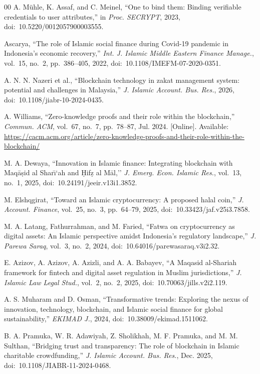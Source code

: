 \documentclass[conference]{IEEEtran}
\begin{document}
\begin{thebibliography}{00}
A. M\"{u}hle, K. Assaf, and C. Meinel, ``One to bind them: Binding verifiable credentials to user attributes,'' in \textit{Proc. SECRYPT}, 2023, doi:~10.5220/0012057900003555.

Ascarya, ``The role of Islamic social finance during Covid-19 pandemic in Indonesia's economic recovery,'' \textit{Int. J. Islamic Middle Eastern Finance Manage.}, vol.~15, no.~2, pp.~386--405, 2022, doi:~10.1108/IMEFM-07-2020-0351.

A. N. N. Nazeri et al., ``Blockchain technology in zakat management system: potential and challenges in Malaysia,'' \textit{J. Islamic Account. Bus. Res.}, 2026, doi:~10.1108/jiabr-10-2024-0435.

A. Williams, ``Zero-knowledge proofs and their role within the blockchain,'' \textit{Commun. ACM}, vol.~67, no.~7, pp.~78--87, Jul. 2024. [Online]. Available: \url{https://cacm.acm.org/article/zero-knowledge-proofs-and-their-role-within-the-blockchain/}

M. A. Dewaya, ``Innovation in Islamic finance: Integrating blockchain with Maq\={a}\d{s}id al Shar\={\i}`ah and \d{H}if\d{z} al M\={a}l,'' \textit{J. Emerg. Econ. Islamic Res.}, vol.~13, no.~1, 2025, doi:~10.24191/jeeir.v13i1.3852.

M. Elshqgirat, ``Toward an Islamic cryptocurrency: A proposed halal coin,'' \textit{J. Account. Finance}, vol.~25, no.~3, pp.~64--79, 2025, doi:~10.33423/jaf.v25i3.7858.

M. A. Latang, Fathurrahman, and M. Faried, ``Fatwa on cryptocurrency as digital assets: An Islamic perspective amidst Indonesia's regulatory landscape,'' \textit{J. Parewa Saraq}, vol.~3, no.~2, 2024, doi:~10.64016/parewasaraq.v3i2.32.

E. Azizov, A. Azizov, A. Azizli, and A. A. Babayev, ``A Maqasid al-Shariah framework for fintech and digital asset regulation in Muslim jurisdictions,'' \textit{J. Islamic Law Legal Stud.}, vol.~2, no.~2, 2025, doi:~10.70063/jills.v2i2.119.

A. S. Muharam and D. Osman, ``Transformative trends: Exploring the nexus of innovation, technology, blockchain, and Islamic social finance for global sustainability,'' \textit{EKIMAD J.}, 2024, doi:~10.38009/ekimad.1511062.

B. A. Pramuka, W. R. Adawiyah, Z. Sholikhah, M. F. Pramuka, and M. M. Sulthan, ``Bridging trust and transparency: The role of blockchain in Islamic charitable crowdfunding,'' \textit{J. Islamic Account. Bus. Res.}, Dec. 2025, doi:~10.1108/JIABR-11-2024-0468.


\end{thebibliography}
\end{document}
